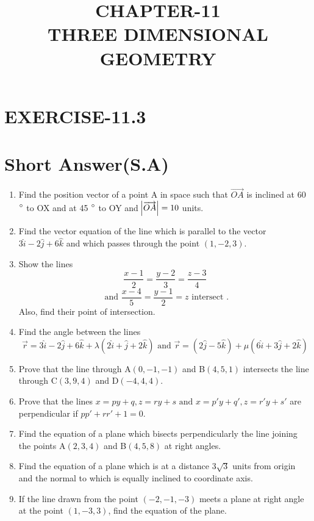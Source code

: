 \documentclass[12pt]{article}
\begin{document}
\title{\textbf{CHAPTER-11 \\THREE DIMENSIONAL GEOMETRY}}
\maketitle
\begin{center}
\end{center}
\section*{EXERCISE-11.3}
\section*{Short Answer(S.A)}
\begin{enumerate}

\item  Find the position vector of a point A in space such that $\overrightarrow{OA}$ is inclined at 60 $\degree$ to OX and at 45 $\degree$ to OY and $\abs{\overrightarrow{OA}} =10$ units.
\item  Find the vector equation of the line which is parallel to the vector $3\hat{i}-2\hat{j}+6\hat{k}$ and which passes through the point $(1,-2,3)$.
\item Show the lines
$$\frac{x-1}{2}=\frac{y-2}{3}=\frac{z-3}{4}$$
$$\text{ and } \frac{x-4}{5}=\frac{y-1}{2}=z  \text{ intersect }.$$
 Also, find their point of intersection.
\item Find the angle between the lines $$\overrightarrow{r}=3\hat{i}-2\hat{j}+6\hat{k}+\lambda(2\hat{i}+\hat{j}+2\hat{k})\text{ and } \overrightarrow{r}=(2\hat{j}-5\hat{k})+\mu(6\hat{i}+3\hat{j}+2\hat{k})$$
\item Prove that the line through A$(0,-1,-1)$ and B$(4,5,1)$ intersects the line through C$(3,9,4)$ and D$(-4,4,4)$.
\item Prove that the lines $x=py+q , z=ry+s \text{ and } x=p\prime y+q\prime, z=r\prime y+s\prime $ are perpendicular if $pp\prime +rr\prime +1=0$.
\item Find the equation of a plane which  bisects perpendicularly the line joining the points A$(2,3,4)$ and B$(4,5,8)$ at right angles.
\item Find the equation of a plane which is at a distance 3$\sqrt{3}$ units from origin and the normal to which is equally inclined to coordinate axis.
\item If the line drawn from the point $(-2,-1,-3)$ meets a plane at right angle at the point $(1,-3,3)$, find the equation of the plane.

\end{enumerate}
\end{document}
